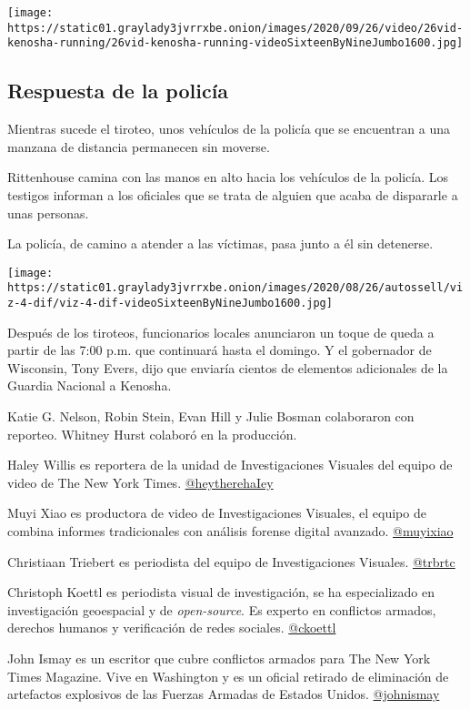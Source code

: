 \texttt{[image: https://static01.graylady3jvrrxbe.onion/images/2020/09/26/video/26vid-kenosha-running/26vid-kenosha-running-videoSixteenByNineJumbo1600.jpg]}

\hypertarget{respuesta-de-la-policuxeda}{%
\subsection{Respuesta de la policía}\label{respuesta-de-la-policuxeda}}

Mientras sucede el tiroteo, unos vehículos de la policía que se
encuentran a una manzana de distancia permanecen sin moverse.

Rittenhouse camina con las manos en alto hacia los vehículos de la
policía. Los testigos informan a los oficiales que se trata de alguien
que acaba de dispararle a unas personas.

La policía, de camino a atender a las víctimas, pasa junto a él sin
detenerse.

\texttt{[image: https://static01.graylady3jvrrxbe.onion/images/2020/08/26/autossell/viz-4-dif/viz-4-dif-videoSixteenByNineJumbo1600.jpg]}

Después de los tiroteos, funcionarios locales anunciaron un toque de
queda a partir de las 7:00 p.m. que continuará hasta el domingo. Y el
gobernador de Wisconsin, Tony Evers, dijo que enviaría cientos de
elementos adicionales de la Guardia Nacional a Kenosha.

Katie G. Nelson, Robin Stein, Evan Hill y Julie Bosman colaboraron con
reporteo. Whitney Hurst colaboró en la producción.

Haley Willis es reportera de la unidad de Investigaciones Visuales del
equipo de video de The New York Times.
\href{https://twitter.com/heytherehaIey}{@heytherehaIey}

Muyi Xiao es productora de video de Investigaciones Visuales, el equipo
de combina informes tradicionales con análisis forense digital avanzado.
\href{https://twitter.com/muyixiao}{@muyixiao}

Christiaan Triebert es periodista del equipo de Investigaciones
Visuales. \href{https://twitter.com/trbrtc}{@trbrtc}

Christoph Koettl es periodista visual de investigación, se ha
especializado en investigación geoespacial y de \emph{open-source}. Es
experto en conflictos armados, derechos humanos y verificación de redes
sociales. \href{https://twitter.com/ckoettl}{@ckoettl}

John Ismay es un escritor que cubre conflictos armados para The New York
Times Magazine. Vive en Washington y es un oficial retirado de
eliminación de artefactos explosivos de las Fuerzas Armadas de Estados
Unidos. \href{https://twitter.com/johnismay}{@johnismay}

